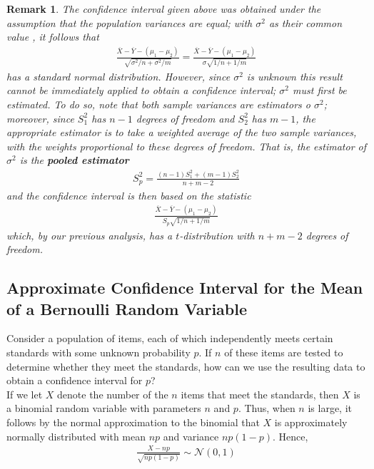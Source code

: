 \documentclass[12pt]{article}
\newtheorem{remark}[theorem]{Remark}
\begin{document}
\begin{remark}
  The confidence interval given above was obtained under the assumption that the population variances are equal; with $\sigma^2$ as their common value , it follows that
  \begin{eqnarray*}
      \frac {\overline{X} - \overline{Y} - (\mu_1 - \mu_2)}
      {\sqrt {\sigma^2 / n + \sigma^2 / m}}
      = \frac {\overline{X} - \overline{Y} - (\mu_1 - \mu_2)}
      {\sigma \sqrt {1 / n + 1 / m}}
  \end{eqnarray*}
  has a standard normal distribution. However, since $\sigma^2$ is unknown this result cannot be immediately applied to obtain a confidence interval; $\sigma^2$ must first be estimated. To do so, note that both sample variances are estimators o $\sigma^2$; moreover, since $S_1^2$ has $n-1$ degrees of freedom and $S_2^2$ has $m-1$, the appropriate estimator is to take a weighted average of the two sample variances, with the weights proportional to these degrees of freedom. That is, the estimator of $\sigma^2$ is the \textbf{pooled estimator}
  \begin{eqnarray*}
    S_p^2 = \frac {(n-1)S_1^2 + (m-1)S_2^2}{n+m-2}
  \end{eqnarray*}
  and the confidence interval is then based on the statistic
  \begin{eqnarray*}
    \frac {\overline{X} - \overline{Y} - (\mu_1 - \mu_2)}
    {S_p \sqrt {1 / n + 1 / m}}
  \end{eqnarray*}
  which, by our previous analysis, has a $t$-distribution with $n+m-2$ degrees of freedom.
\end{remark}

\subsection{Approximate Confidence Interval for the Mean of a Bernoulli Random Variable}

Consider a population of items, each of which independently meets certain standards with some unknown probability $p$. If $n$ of these items are tested to determine whether they meet the standards, how can we use the resulting data to obtain a confidence interval for $p$? \\

If we let $X$ denote the number of the $n$ items that meet the standards, then $X$ is a binomial random variable with parameters $n$ and $p$. Thus, when $n$ is large, it follows by the normal approximation to the binomial that $X$ is approximately normally distributed with mean $np$ and variance $np(1-p)$. Hence,
\begin{eqnarray*}
  \frac {X - np}{\sqrt {np(1-p)}} \sim \mathcal{N}(0,1)
\end{eqnarray*}
\end{document}
